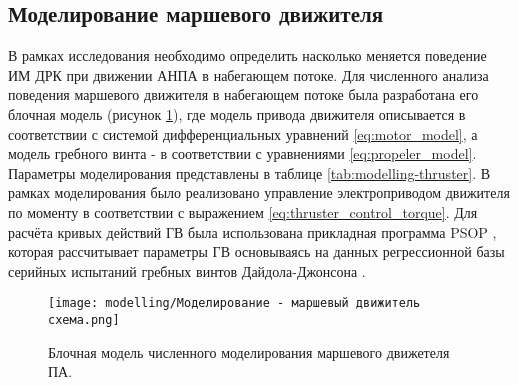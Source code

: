 \subsection{Моделирование маршевого движителя}
В рамках исследования необходимо определить насколько меняется поведение ИМ ДРК при движении АНПА в набегающем потоке.
Для численного анализа поведения маршевого движителя в набегающем потоке была разработана его блочная модель (рисунок \ref{fig:modelling-thruster}), где модель привода движителя описывается в соответствии с системой дифференциальных уравнений \ref{eq:motor_model}, а модель гребного винта - в соответствии с уравнениями \ref{eq:propeler_model}.
Параметры моделирования представлены в таблице \ref{tab:modelling-thruster}.
В рамках моделирования было реализовано управление электроприводом движителя по моменту в соответствии с выражением \ref{eq:thruster_control_torque}.
Для расчёта кривых действий ГВ была использована прикладная программа PSOP \cite{инзарцев2018подводные}, которая рассчитывает параметры ГВ основываясь на данных регрессионной
базы серийных испытаний гребных винтов Дайдола-Джонсона \cite{daidola1992propeller}.

\begin{figure}[ht]
    \centering
    \texttt{[image: modelling/Моделирование - маршевый движитель схема.png]}
    \caption{Блочная модель численного моделирования маршевого движетеля ПА.}
    \label{fig:modelling-thruster}
\end{figure}

